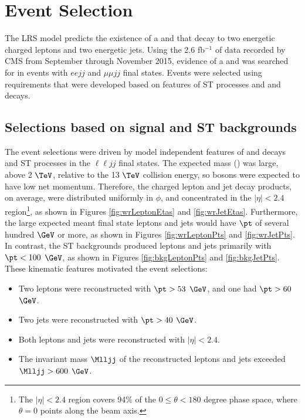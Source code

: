 \chapter{Event Selection}
\label{sec:event_selection_chapter}

The LRS model predicts the existence of a \WR and \nul that decay to two energetic charged leptons and two 
energetic jets.  Using the 2.6 fb$^{-1}$ \cite{lumi} of data recorded by CMS from September through November 
2015, evidence of a \WR and \nul was searched for in events with $eejj$ and $\mu\mu jj$ final states.  
Events were selected using requirements that were developed based on features of ST processes and \WR and \nul 
decays.


\section{Selections based on \WR signal and ST backgrounds}
\label{sec:signalAndBkgndFeatures}
The event selections were driven by model independent features of \WR and \nul decays and ST processes in the $\ell\ell jj$ 
final states.  The expected \WR mass (\mWR) was large, above 2 $\TeV$, relative to the 13 $\TeV$ collision energy, 
so \WR bosons were expected to have low net momentum.  Therefore, the charged lepton and jet decay 
products, on average, were distributed uniformly in $\phi$, and concentrated in the $|\eta| < 2.4$ 
region\footnote{The $|\eta| < 2.4$ region covers 94\% of the $0 \leq \theta < 180$ degree phase space, where 
$\theta = 0$ points along the beam axis.}, 
as shown in Figures \ref{fig:wrLeptonEtas} and \ref{fig:wrJetEtas}.  Furthermore, the large expected 
\mWR meant final state leptons and jets would have $\pt$ of several hundred $\GeV$ or more, as shown in 
Figures \ref{fig:wrLeptonPts} and \ref{fig:wrJetPts}.  In contrast, the ST backgrounds 
produced leptons and jets primarily with $\pt < 100$ $\GeV$, as shown in Figures \ref{fig:bkgLeptonPts} 
and \ref{fig:bkgJetPts}.  These kinematic features motivated the event selections:

\begin{itemize}
	\item Two leptons were reconstructed with $\pt > 53$ $\GeV$, and one had $\pt > 60$ $\GeV$.
	\item Two jets were reconstructed with $\pt > 40$ $\GeV$.
	\item Both leptons and jets were reconstructed with $|\eta| < 2.4$.
	\item The invariant mass $\Mlljj$ of the reconstructed leptons and jets exceeded $\Mlljj > 600$ $\GeV$.
\end{itemize}

